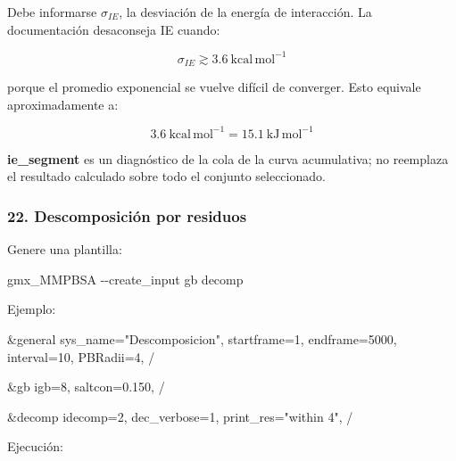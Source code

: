 \documentclass[
  spanish,
  11pt,
  a4paper]{article}
\newenvironment{Shaded}{\begin{snugshade}}{\end{snugshade}}
\newcommand{\AttributeTok}[1]{\textcolor[rgb]{0.13,0.29,0.53}{#1}}
\newcommand{\ExtensionTok}[1]{#1}
\newcommand{\NormalTok}[1]{#1}
\begin{document}
Debe informarse \(\sigma_{IE}\), la desviación de la energía de
interacción. La documentación desaconseja IE cuando:

\[
\sigma_{IE}\gtrsim3.6\ \mathrm{kcal\,mol^{-1}}
\]

porque el promedio exponencial se vuelve difícil de converger. Esto
equivale aproximadamente a:

\[
3.6\ \mathrm{kcal\,mol^{-1}}
=
15.1\ \mathrm{kJ\,mol^{-1}}
\]

\textbf{ie\_segment} es un diagnóstico de la cola de la curva
acumulativa; no reemplaza el resultado calculado sobre todo el conjunto
seleccionado.

\subsubsection{22. Descomposición por
residuos}\label{descomposiciuxf3n-por-residuos}

Genere una plantilla:

\begin{Shaded}
\begin{Highlighting}[]
\ExtensionTok{gmx\_MMPBSA} \AttributeTok{{-}{-}create\_input}\NormalTok{ gb decomp}
\end{Highlighting}
\end{Shaded}

Ejemplo:

\begin{Shaded}
\begin{Highlighting}[]
\NormalTok{\&general}
\NormalTok{  sys\_name="Descomposicion",}
\NormalTok{  startframe=1,}
\NormalTok{  endframe=5000,}
\NormalTok{  interval=10,}
\NormalTok{  PBRadii=4,}
\NormalTok{/}

\NormalTok{\&gb}
\NormalTok{  igb=8,}
\NormalTok{  saltcon=0.150,}
\NormalTok{/}

\NormalTok{\&decomp}
\NormalTok{  idecomp=2,}
\NormalTok{  dec\_verbose=1,}
\NormalTok{  print\_res="within 4",}
\NormalTok{/}
\end{Highlighting}
\end{Shaded}

Ejecución:
\end{document}
